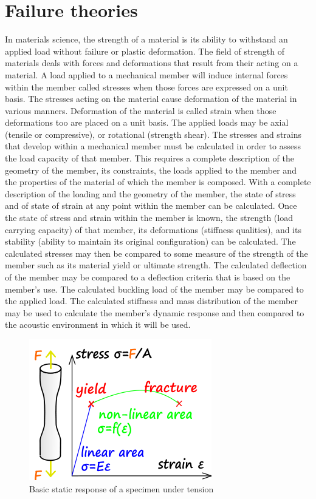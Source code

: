 
\chapter{Failure theories}
In materials science, the strength of a material is its ability to withstand an applied load without failure or plastic deformation. The field of strength of materials deals with forces and deformations that result from their acting on a material. A load applied to a mechanical member will induce internal forces within the member called stresses when those forces are expressed on a unit basis. The stresses acting on the material cause deformation of the material in various manners. Deformation of the material is called strain when those deformations too are placed on a unit basis. The applied loads may be axial (tensile or compressive), or rotational (strength shear). The stresses and strains that develop within a mechanical member must be calculated in order to assess the load capacity of that member. This requires a complete description of the geometry of the member, its constraints, the loads applied to the member and the properties of the material of which the member is composed. With a complete description of the loading and the geometry of the member, the state of stress and of state of strain at any point within the member can be calculated. Once the state of stress and strain within the member is known, the strength (load carrying capacity) of that member, its deformations (stiffness qualities), and its stability (ability to maintain its original configuration) can be calculated. The calculated stresses may then be compared to some measure of the strength of the member such as its material yield or ultimate strength. The calculated deflection of the member may be compared to a deflection criteria that is based on the member's use. The calculated buckling load of the member may be compared to the applied load. The calculated stiffness and mass distribution of the member may be used to calculate the member's dynamic response and then compared to the acoustic environment in which it will be used. \\

\begin{figure}[h!]
	\centering
	\includegraphics[width=0.5\linewidth]{figures/tension_test}
	\caption{Basic static response of a specimen under tension}
	\label{fig:tensiontest}
\end{figure}

